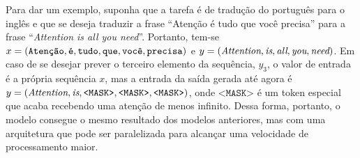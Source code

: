 Para dar um exemplo, suponha que a tarefa é de tradução do português para o
inglês e que se deseja traduzir a frase ``Atenção é tudo que você precisa'' para
a frase ``\textit{Attention is all you need}''. Portanto, tem-se
$x=\left( \texttt{Atenção}, \texttt{é}, \texttt{tudo}, \texttt{que},
\texttt{você}, \texttt{precisa} \right)$ e $y=\left( \textit{Attention}, \textit{is},
\textit{all}, \textit{you}, \textit{need} \right)$. Em caso de se desejar prever o
terceiro elemento da sequência, $y_3$, o valor de entrada é a própria sequência
$x$, mas a entrada da saída gerada até agora é $y=\left( \textit{Attention},
\textit{is}, \texttt{<MASK>}, \texttt{<MASK>}, \texttt{<MASK>} \right)$, onde
$\texttt{<MASK>}$ é um token especial que acaba recebendo uma atenção de menos
infinito. Dessa forma, portanto, o modelo consegue o mesmo resultado dos modelos
anteriores, mas com uma arquitetura que pode ser paralelizada para alcançar uma
velocidade de processamento maior.

